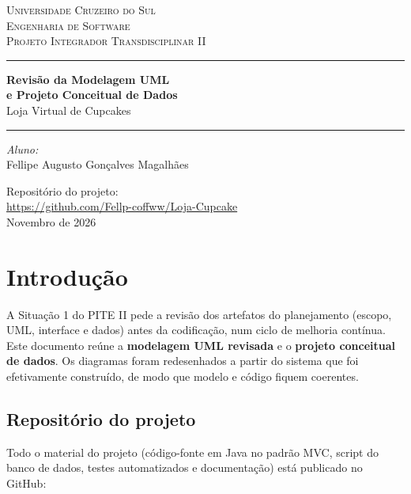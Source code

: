 \documentclass[12pt]{article}
\begin{document}
\begin{titlepage}
    \centering
    \textsc{\Large Universidade Cruzeiro do Sul}\\[0.5cm]
    \textsc{\Large Engenharia de Software}\\[0.5cm]
    \textsc{Projeto Integrador Transdisciplinar II}
    \vspace{2.2cm}

    \hrule \vspace{0.4cm}
    {\huge \bfseries Revisão da Modelagem UML\\[0.3cm] e Projeto Conceitual de Dados}\\[0.4cm]
    {\Large Loja Virtual de Cupcakes}\\[0.3cm]
    \hrule
    \vspace{3cm}

    \begin{flushleft}
        \Large \emph{Aluno:}\\
        Fellipe Augusto Gonçalves Magalhães
    \end{flushleft}
    \vfill
    {\large Repositório do projeto:\\ \url{https://github.com/Fellp-coffww/Loja-Cupcake}}\\[0.4cm]
    {\large Novembro de 2026}
\end{titlepage}

\tableofcontents
\newpage

\section{Introdução}

A Situação 1 do PITE II pede a revisão dos artefatos do planejamento (escopo, UML, interface e dados) antes da codificação, num ciclo de melhoria contínua. Este documento reúne a \textbf{modelagem UML revisada} e o \textbf{projeto conceitual de dados}. Os diagramas foram redesenhados a partir do sistema que foi efetivamente construído, de modo que modelo e código fiquem coerentes.

\subsection{Repositório do projeto}

Todo o material do projeto (código-fonte em Java no padrão MVC, script do banco de dados, testes automatizados e documentação) está publicado no GitHub:
\end{document}
